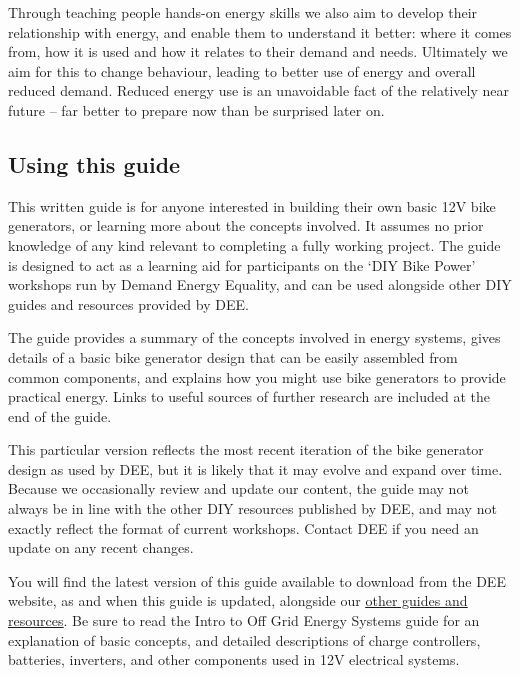 \documentclass{article}
\theoremstyle{definition}
\theoremstyle{definition}
\theoremstyle{remark}
\begin{document}
    Through teaching people hands-on energy skills we also aim to develop their relationship with energy, and enable them to understand it better: where it comes from, how it is used and how it relates to their demand and needs. Ultimately we aim for this to change behaviour, leading to better use of energy and overall reduced demand. Reduced energy use is an unavoidable fact of the relatively near future – far better to prepare now than be surprised later on.

  
  \subsection{Using this guide} %
  \label{sub:using_this_guide}

    This written guide is for anyone interested in building their own basic 12V bike generators, or learning more about the concepts involved. It assumes no prior knowledge of any kind relevant to completing a fully working project. The guide is designed to act as a learning aid for participants on the ‘DIY Bike Power’ workshops run by Demand Energy Equality, and can be used alongside other DIY guides and resources provided by DEE. 

    The guide provides a summary of the concepts involved in energy systems, gives details of a basic bike generator design that can be easily assembled from common components, and explains how you might use bike generators to provide practical energy. Links to useful sources of further research are included at the end of the guide.

    This particular version reflects the most recent iteration of the bike generator design as used by DEE, but it is likely that it may evolve and expand over time. Because we occasionally review and update our content, the guide may not always be in line with the other DIY resources published by DEE, and may not exactly reflect the format of current workshops. Contact DEE if you need an update on any recent changes. 
    
    You will find the latest version of this guide available to download from the DEE website, as and when this guide is updated, alongside our \href{https://www.demandenergyequality.org/resources/}{\underline{other guides and resources}}. Be sure to read the Intro to Off Grid Energy Systems guide for an explanation of basic concepts, and detailed descriptions of charge controllers, batteries, inverters, and other components used in 12V electrical systems.
\end{document}
